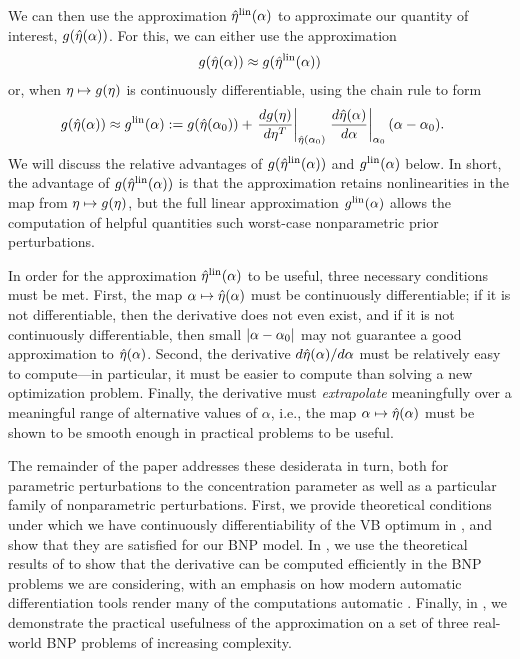 We can then use the approximation $\hat\eta^{\mathrm{lin}}(\alpha)$ to approximate our quantity
of interest, $g(\hat\eta(\alpha))$.  For this, we can either use the
approximation
%
\begin{align*}
%
\g(\etaopt(\alpha)) \approx{} \g(\etalin(\alpha))
%
\end{align*}
%
or, when $\eta \mapsto g(\eta)$ is continuously differentiable, using the chain
rule to form
%
\begin{align*}
%
\g(\etaopt(\alpha)) \approx{}&
    \glin(\alpha) :=
        \g(\etaopt(\alpha_0)) +
            \fracat{d \g(\eta)}{ d\eta^T}{\etaopt(\alpha_0)}
            \fracat{d \etaopt(\alpha)}{d\alpha}{\alpha_0} (\alpha - \alpha_0).
%
\end{align*}
%
We will discuss the relative advantages of $g(\hat\eta^{\mathrm{lin}}(\alpha))$ and
$g^{\mathrm{lin}}(\alpha)$ below.  In short, the advantage of $g(\hat\eta^{\mathrm{lin}}(\alpha))$ is that
the approximation retains nonlinearities in the map from $\eta \mapsto
g(\eta)$, but the full linear approximation $g^{\mathrm{lin}}(\alpha)$ allows the
computation of helpful quantities such worst-case nonparametric prior
perturbations.

In order for the approximation $\hat\eta^{\mathrm{lin}}(\alpha)$ to be useful, three necessary
conditions must be met.  First, the map $\alpha \mapsto \hat\eta(\alpha)$ must be
continuously differentiable; if it is not differentiable, then the derivative
does not even exist, and if it is not continuously differentiable, then small
$\left|\alpha - \alpha_0\right|$ may not guarantee a good approximation to
$\hat\eta(\alpha)$. Second, the derivative $d \hat\eta(\alpha) / d\alpha$ must be
relatively easy to compute---in particular, it must be easier to compute than
solving a new optimization problem.  Finally, the derivative must {\em
extrapolate} meaningfully over a meaningful range of alternative values of
$\alpha$, i.e., the map $\alpha \mapsto \hat\eta(\alpha)$ must be shown to be
smooth enough in practical problems to be useful.

The remainder of the paper addresses these desiderata in turn, both for
parametric perturbations to the concentration parameter as well as a particular
family of nonparametric perturbations.  First, we provide theoretical conditions
under which we have continuously differentiability of the VB optimum in
, and show that they are satisfied for our BNP model.
In , we use the theoretical results of
 to show that the derivative can be computed
efficiently in the BNP problems we are considering, with an emphasis on how
modern automatic differentiation tools render many of the computations automatic
\citep{jax2018github}.  Finally, in , we demonstrate the
practical usefulness of the approximation on a set of three real-world BNP
problems of increasing complexity.
